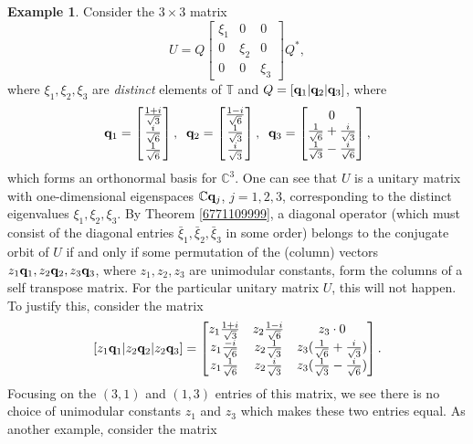 \documentclass{dis}
\theoremstyle{plain}
\theoremstyle{definition}
\newtheorem{Example}[equation]{Example}
\def\C{\mathbb{C}}
\def\T{\mathbb{T}}
\renewcommand{\vec}[1]{{\bf #1}}
\newcommand{\0}{{\color{lightgray}0}}
\begin{document}
\begin{Example}\label{qudiagonall9}
Consider the $3 \times 3$ matrix 
$$U = Q \begin{bmatrix} \xi_1 & 0 & 0\\ 0 & \xi_2 & 0\\ 0 & 0 & \xi_3\end{bmatrix} Q^{*},$$
where $\xi_1, \xi_2, \xi_3$ are {\em distinct} elements of $\T$ and $Q = [\vec{q}_1 | \vec{q}_2 | \vec{q}_3]$, where 
$$\vec{q}_1 = \begin{bmatrix}\frac{1+i}{\sqrt{3}}\\ \frac{i}{\sqrt{6}}\\ \frac{1}{\sqrt{6}}\end{bmatrix}, \; \; 
\vec{q}_2 = \begin{bmatrix}\frac{1-i}{\sqrt{6}}\\ \frac{1}{\sqrt{3}}\\\frac{i}{\sqrt{3}}\end{bmatrix}, \; \; 
\vec{q}_3 = \begin{bmatrix}0 \\ \frac{1}{\sqrt{6}}+\frac{i}{\sqrt{3}}\\\frac{1}{\sqrt{3}}-\frac{i}{\sqrt{6}}\end{bmatrix},$$
which forms an orthonormal basis for $\C^{3}$. One can see that $U$ is a unitary matrix with one-dimensional eigenspaces $\C \vec{q}_j$, $j  = 1, 2, 3$, corresponding to the distinct eigenvalues $\xi_1, \xi_2, \xi_3$. By Theorem \ref{6771109999}, a diagonal operator (which must consist of the diagonal entries $\bar \xi_1, \bar \xi_2, \bar \xi_3$ in some order) belongs to the conjugate orbit of $U$ if and only if some permutation of the (column) vectors $z_1 \vec{q}_1, z_2 \vec{q}_2, z_3 \vec{q}_3$, where $z_1, z_2, z_3$ are unimodular constants, form the columns of a self transpose matrix. For the particular unitary matrix $U$, this will not happen. To justify this, consider 
the matrix 
$$[z_1 \vec{q}_1 | z_2 \vec{q}_2 | z_2 \vec{q}_3] =
\begin{bmatrix} z_1 \frac{1+i}{\sqrt{3}} & z_2 \frac{1-i}{\sqrt{6}} & z_3 \cdot 0 \\
z_1 \frac{-i}{\sqrt{6}} & z_2 \frac{1}{\sqrt{3}} & z_3 (\frac{1}{\sqrt{6}}+\frac{i}{\sqrt{3}}) \\
z_1  \frac{1}{\sqrt{6}} & z_2 \frac{i}{\sqrt{3}} & z_3 (\frac{1}{\sqrt{3}}-\frac{i}{\sqrt{6}} )
 \end{bmatrix}.$$
 Focusing on the $(3, 1)$ and $(1, 3)$ entries of this matrix, we see there is no choice of unimodular constants $z_1$ and  $z_3$ which makes these two entries equal. As another example, consider the matrix 

\end{Example}
\end{document}

